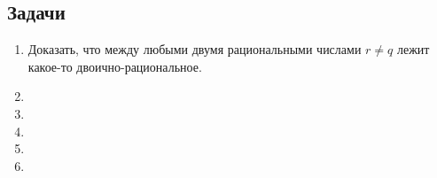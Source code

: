 \subsection*{Задачи}
\begin{enumerate}
\item Доказать, что между любыми двумя рациональными числами $r\ne q$ лежит какое-то двоично-рациональное.
\item 
\item 
\item 
\item 
\item 


\end{enumerate}







